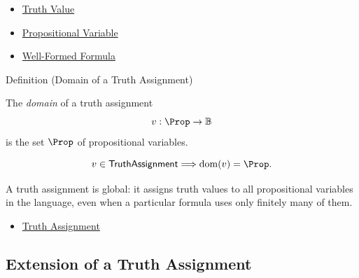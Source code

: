 \begin{dependencies}
\begin{itemize}
  \item \hyperref[def:truth-value-propositional-logic]{Truth Value}
  \item \hyperref[def:propositional-variable]{Propositional Variable}
  \item \hyperref[def:well-formed-formula]{Well-Formed Formula}
\end{itemize}
\end{dependencies}

\begin{definitionbox}{Definition (Domain of a Truth Assignment)}
\begin{definition}
\label{def:truth-assignment-domain-propositional-logic}
The \emph{domain} of a truth assignment
\[
v:\Prop\to\mathbb{B}
\]
is the set \(\Prop\) of propositional variables.
\end{definition}
\end{definitionbox}

\begin{remark*}
\[
v\in\mathsf{TruthAssignment}\Longrightarrow \operatorname{dom}(v)=\Prop.
\]
\end{remark*}

\begin{remark*}[Interpretation]
A truth assignment is global: it assigns truth values to all propositional
variables in the language, even when a particular formula uses only finitely many
of them.
\end{remark*}

\begin{dependencies}
\begin{itemize}
  \item \hyperref[def:truth-assignment-propositional-logic]{Truth Assignment}
\end{itemize}
\end{dependencies}

\subsection*{Extension of a Truth Assignment}
\label{subsec:extension-of-truth-assignment-propositional-logic}

